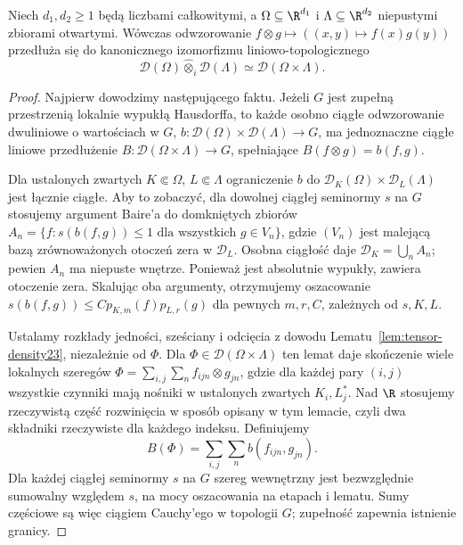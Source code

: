 \begin{twierdzenie}
\label{thm:D-i-product24}
Niech $d_1,d_2\ge1$ będą liczbami całkowitymi, a
$\Omega\subseteq\R^{d_1}$ i $\Lambda\subseteq\R^{d_2}$
niepustymi zbiorami otwartymi. Wówczas odwzorowanie
$f\otimes g\mapsto ((x,y)\mapsto f(x)g(y))$ przedłuża się
do kanonicznego izomorfizmu liniowo-topologicznego
\[
 \mathcal D(\Omega)\widehat\otimes_i\mathcal D(\Lambda)
 \simeq \mathcal D(\Omega\times\Lambda).
\]
\end{twierdzenie}
\begin{proof}
Najpierw dowodzimy następującego faktu. Jeżeli $G$ jest
zupełną przestrzenią lokalnie wypukłą Hausdorffa, to każde
osobno ciągłe odwzorowanie dwuliniowe o wartościach w $G$,
$b:\mathcal D(\Omega)\times\mathcal D(\Lambda)\to G$,
ma jednoznaczne ciągłe liniowe przedłużenie
$B:\mathcal D(\Omega\times\Lambda)\to G$, spełniające
$B(f\otimes g)=b(f,g)$.

Dla ustalonych zwartych $K\Subset\Omega$,
$L\Subset\Lambda$ ograniczenie $b$ do
$\mathcal D_K(\Omega)\times\mathcal D_L(\Lambda)$ jest
łącznie ciągłe. Aby to zobaczyć, dla dowolnej ciągłej
seminormy $s$ na $G$ stosujemy argument Baire'a
do domkniętych zbiorów
$A_n=\{f:s(b(f,g))\le1\text{ dla wszystkich }g\in V_n\}$,
gdzie $(V_n)$ jest malejącą bazą zrównoważonych otoczeń
zera w $\mathcal D_L$. Osobna ciągłość daje
$\mathcal D_K=\bigcup_n A_n$; pewien $A_n$ ma niepuste
wnętrze. Ponieważ jest absolutnie wypukły, zawiera
otoczenie zera. Skalując oba argumenty, otrzymujemy oszacowanie
$s(b(f,g))\le C p_{K,m}(f)p_{L,r}(g)$ dla pewnych
$m,r,C$, zależnych od $s,K,L$.

Ustalamy rozkłady jedności, sześciany i odcięcia
z dowodu Lematu~\ref{lem:tensor-density23}, niezależnie
od $\Phi$. Dla $\Phi\in\mathcal D(\Omega\times\Lambda)$
ten lemat daje skończenie wiele lokalnych szeregów
$\Phi=\sum_{i,j}\sum_n f_{ijn}\otimes g_{jn}$,
gdzie dla każdej pary $(i,j)$ wszystkie czynniki
mają nośniki w ustalonych zwartych $K_i,L_j^*$.
Nad $\R$ stosujemy rzeczywistą część rozwinięcia
w sposób opisany w tym lemacie, czyli dwa składniki
rzeczywiste dla każdego indeksu.
Definiujemy
\[
 B(\Phi)=\sum_{i,j}\sum_n b(f_{ijn},g_{jn}).
\]
Dla każdej ciągłej seminormy $s$ na $G$ szereg
wewnętrzny jest bezwzględnie sumowalny względem $s$,
na mocy oszacowania na etapach i lematu.
Sumy częściowe są więc ciągiem Cauchy'ego
w topologii $G$; zupełność zapewnia istnienie granicy.


\end{proof}
